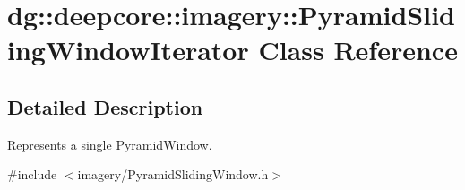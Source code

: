 \hypertarget{classdg_1_1deepcore_1_1imagery_1_1_pyramid_sliding_window_iterator}{}\section{dg\+:\+:deepcore\+:\+:imagery\+:\+:Pyramid\+Sliding\+Window\+Iterator Class Reference}
\label{classdg_1_1deepcore_1_1imagery_1_1_pyramid_sliding_window_iterator}


\subsection{Detailed Description}
Represents a single \hyperlink{structdg_1_1deepcore_1_1imagery_1_1_pyramid_window}{Pyramid\+Window}. 

{\ttfamily \#include $<$imagery/\+Pyramid\+Sliding\+Window.\+h$>$}

